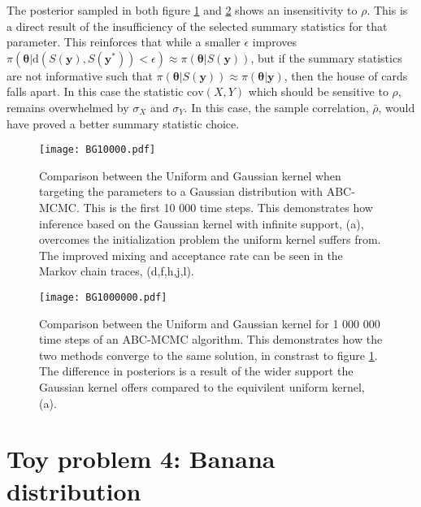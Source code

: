 The posterior sampled in both figure \ref{KuVSKg-1} and \ref{KuVSKg-2} shows an insensitivity to $\rho$. This is a direct result of the insufficiency of the selected summary statistics for that parameter. This reinforces that while a smaller $\epsilon$ improves $\pi(\bm{\theta}|\text{d}(S(\bm{y}),S(\bm{y^*}))<\epsilon) \approx \pi(\bm{\theta}|S(\bm{y}))$, but if the summary statistics are not informative such that $\pi(\bm{\theta}|S(\bm{y})) \approx \pi(\bm{\theta}|\bm{y})$, then the house of cards falls apart. In this case the statistic $\text{cov}(X,Y)$ which should be sensitive to $\rho$, remains overwhelmed by $\sigma_X$ and $\sigma_Y$. In this case, the sample correlation, $\bar{\rho}$, would have proved a better summary statistic choice. 

\begin{figure}[H]
	\centering
	\texttt{[image: BG10000.pdf]}
	\caption{Comparison between the Uniform and Gaussian kernel when targeting the parameters to a Gaussian distribution with ABC-MCMC. This is the first 10 000 time steps. This demonstrates how inference based on the Gaussian kernel with infinite support, (a), overcomes the initialization problem the uniform kernel suffers from. The improved mixing and acceptance rate can be seen in the Markov chain traces, (d,f,h,j,l).}
	\label{KuVSKg-1}
\end{figure}

\begin{figure}[H]
	\centering
	\texttt{[image: BG1000000.pdf]}
	\caption{Comparison between the Uniform and Gaussian kernel for 1 000 000 time steps of an ABC-MCMC algorithm. This demonstrates how the two methods converge to the same solution, in constrast to figure \ref{KuVSKg-1}. The difference in posteriors is a result of the wider support the Gaussian kernel offers compared to the equivilent uniform kernel, (a).}
	\label{KuVSKg-2}
\end{figure} 

\section{Toy problem 4: Banana distribution}

